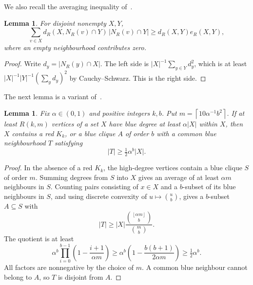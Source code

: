 \documentclass[11pt]{article}
\newtheorem{lemma}[theorem]{Lemma}
\theoremstyle{definition}
\theoremstyle{remark}
\newcommand{\ceil}[1]{\left\lceil #1\right\rceil}
\newcommand{\floor}[1]{\left\lfloor #1\right\rfloor}
\numberwithin{equation}{section}
\begin{document}
We also recall the averaging inequality of~\cite[Lemma~7]{GNNW}.

\begin{lemma}\label{lem:averaging}
For disjoint nonempty $X,Y$,
\[
 \sum_{v\in X}d_R(X,N_R(v)\cap Y)\,|N_R(v)\cap Y|
 \ge d_R(X,Y)e_R(X,Y),
\]
where an empty neighbourhood contributes zero.
\end{lemma}
\begin{proof}
Write $d_y=|N_R(y)\cap X|$. The left side is $|X|^{-1}\sum_{y\in Y}d_y^2$, which is at least $|X|^{-1}|Y|^{-1}(\sum_y d_y)^2$ by Cauchy--Schwarz. This is the right side.
\end{proof}

The next lemma is a variant of~\cite[Lemma~9]{GNNW}.

\begin{lemma}\label{lem:blue-book}
Fix $\alpha\in(0,1)$ and positive integers $k,b$. Put $m=\ceil{10\alpha^{-1}b^2}$. If at least $R(k,m)$ vertices of a set $X$ have blue degree at least $\alpha|X|$ within $X$, then $X$ contains a red $K_k$, or a blue clique $A$ of order $b$ with a common blue neighbourhood $T$ satisfying
\[
 |T|\ge\tfrac12\alpha^b|X|.
\]
\end{lemma}
\begin{proof}
In the absence of a red $K_k$, the high-degree vertices contain a blue clique $S$ of order $m$. Summing degrees from $S$ into $X$ gives an average of at least $\alpha m$ neighbours in $S$. Counting pairs consisting of $x\in X$ and a $b$-subset of its blue neighbours in $S$, and using discrete convexity of $u\mapsto\binom ub$, gives a $b$-subset $A\subseteq S$ with
\[
 |T|\ge |X|\frac{\binom{\floor{\alpha m}}b}{\binom mb}.
\]
The quotient is at least
\[
 \alpha^b\prod_{i=0}^{b-1}\left(1-\frac{i+1}{\alpha m}\right)
 \ge\alpha^b\left(1-\frac{b(b+1)}{2\alpha m}\right)
 \ge\tfrac12\alpha^b.
\]
All factors are nonnegative by the choice of $m$. A common blue neighbour cannot belong to $A$, so $T$ is disjoint from $A$.
\end{proof}
\end{document}
